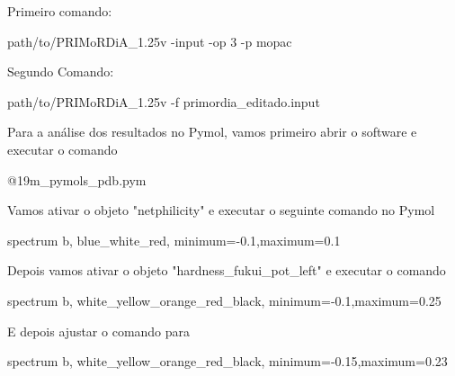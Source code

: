 \documentclass[a4paper,11pt]{refart}
\begin{document}
	Primeiro comando:
	
	\hspace*{-\leftmarginwidth}
	\begin{minipage}{\fullwidth}
		\begin{commandshell}path/to/PRIMoRDiA_1.25v -input -op 3 -p mopac\end{commandshell}
	\end{minipage}

	Segundo Comando:
	
	\hspace*{-\leftmarginwidth}
	\begin{minipage}{\fullwidth}
		\begin{commandshell}path/to/PRIMoRDiA_1.25v -f primordia_editado.input\end{commandshell}
	\end{minipage}

	Para a análise dos resultados no Pymol, vamos primeiro abrir o software e executar o comando 
	
	\hspace*{-\leftmarginwidth}
	\begin{minipage}{\fullwidth}
		\begin{pymol}@19m_pymols_pdb.pym\end{pymol}
	\end{minipage}
	
	Vamos ativar o objeto "netphilicity" e executar o seguinte comando no Pymol 
	
	 \hspace*{-\leftmarginwidth}
	 \begin{minipage}{\fullwidth}
	 	\begin{pymol}spectrum b, blue_white_red, minimum=-0.1,maximum=0.1\end{pymol}
	 \end{minipage}
	
	Depois vamos ativar o objeto "hardness\_fukui\_pot\_left" e executar o comando


	\hspace*{-\leftmarginwidth}
	\begin{minipage}{\fullwidth}
		\begin{pymol}spectrum b, white_yellow_orange_red_black, minimum=-0.1,maximum=0.25\end{pymol}
	\end{minipage}
	
	E depois ajustar o comando para
	
	\hspace*{-\leftmarginwidth}
	\begin{minipage}{\fullwidth}
		\begin{pymol}spectrum b, white_yellow_orange_red_black, minimum=-0.15,maximum=0.23\end{pymol}
	\end{minipage}
\end{document}
